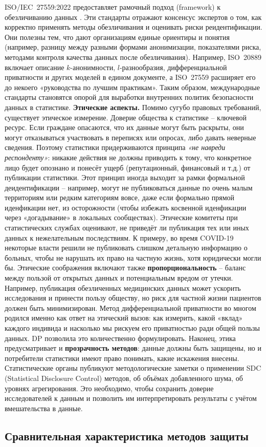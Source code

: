 ISO/IEC 27559:2022 предоставляет рамочный подход (framework) к обезличиванию данных \autocite{ISO-IEC-27559-2022}. Эти стандарты отражают консенсус экспертов о том, как корректно применять методы обезличивания и оценивать риски реидентификации. Они полезны тем, что дают организациям единые ориентиры и понятия (например, разницу между разными формами анонимизации, показателями риска, методами контроля качества данных после обезличивания). Например, ISO 20889 включает описание $k$-анонимности, $l$-разнообразия, дифференциальной приватности и других моделей в едином документе, а ISO 27559 расширяет его до некоего «руководства по лучшим практикам». Таким образом, международные стандарты становятся опорой для выработки внутренних политик безопасности данных в статистике. \textbf{Этические аспекты.} Помимо сугубо правовых требований, существует этическое измерение. Доверие общества к статистике – ключевой ресурс. Если граждане опасаются, что их данные могут быть раскрыты, они могут отказываться участвовать в переписях или опросах, либо давать неверные сведения. Поэтому статистики придерживаются принципа \textit{«не навреди респонденту»}: никакие действия не должны приводить к тому, что конкретное лицо будет опознано и понесёт ущерб (репутационный, финансовый и т.д.) от публикации статистики. Этот принцип иногда выходит за рамки формальной деидентификации – например, могут не публиковаться данные по очень малым территориям или редким категориям вовсе, даже если формально прямой иденфикации нет, из осторожности (чтобы избежать косвенной иденфикации через «догадывание» в локальных сообществах). Этические комитеты при статистических службах оценивают, не приведёт ли публикация тех или иных данных к нежелательным последствиям. К примеру, во время COVID-19 некоторые власти решили не публиковать слишком детальную информацию о больных, чтобы не нарушать их право на частную жизнь, хотя юридически могли бы. Этические соображения включают также \textbf{пропорциональность} – баланс между пользой от открытых данных и потенциальным вредом от утечки. Например, публикация обезличенных медицинских данных может ускорить исследования и принести пользу обществу, но риск для частной жизни пациентов должен быть минимизирован. Метод дифференциальной приватности во многом родился именно как ответ на этический вызов: как измерить, какой «вклад» каждого индивида и насколько мы рискуем его приватностью ради общей пользы данных. DP позволила это количественно формулировать. Наконец, этика предусматривает и \textbf{прозрачность методов}: данные должны быть защищены, но и потребители статистики имеют право понимать, какие искажения внесены. Статистические органы публикуют методологические заметки о применении SDC (Statistical Disclosure Control) методов, об объёмах добавленного шума, об уровнях агрегирования. Это необходимо, чтобы сохранить доверие исследователей к данным и позволить им интерпретировать результаты с учётом вмешательства в данные. \subsection{Сравнительная характеристика методов защиты}
